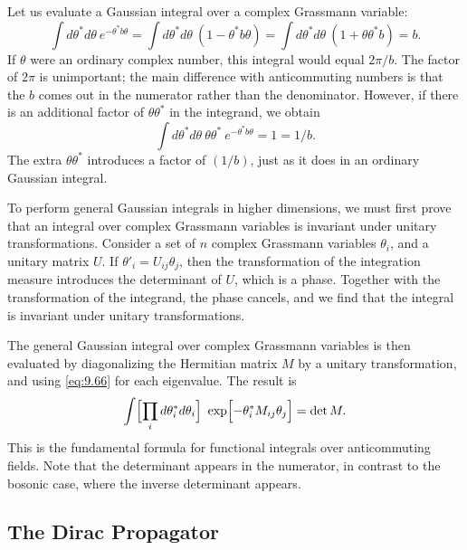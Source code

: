 Let us evaluate a Gaussian integral over a complex Grassmann variable:
\begin{equation}
  \int d\theta^{*}d\theta\ e^{-\theta^{*}b\theta}
  = \int d\theta^{*}d\theta\ (1 - \theta^{*}b\theta)
  = \int d\theta^{*}d\theta\ (1 + \theta\theta^{*}b) = b .
  \label{eq:9.66}
\end{equation}
If $\theta$ were an ordinary complex number, this integral would equal
$2\pi/b$.  The factor of $2\pi$ is unimportant; the main difference with
anticommuting numbers is that the $b$ comes out in the numerator rather than
the denominator.  However, if there is an additional factor of $\theta\theta^{*}$
in the integrand, we obtain
\begin{equation}
  \int d\theta^{*}d\theta\ \theta\theta^{*}\ e^{-\theta^{*}b\theta}
  = 1 = 1/b .
  \label{eq:9.67}
\end{equation}
The extra $\theta\theta^{*}$ introduces a factor of $(1/b)$, just as it does in
an ordinary Gaussian integral.

To perform general Gaussian integrals in higher dimensions, we must first
prove that an integral over complex Grassmann variables is invariant under
unitary transformations.  Consider a set of $n$ complex Grassmann variables
$\theta_i$, and a unitary matrix $U$.  If $\theta'_i = U_{ij}\theta_j$, then
the transformation of the integration measure introduces the determinant of
$U$, which is a phase.  Together with the transformation of the integrand, the
phase cancels, and we find that the integral is invariant under unitary
transformations.

The general Gaussian integral over complex Grassmann variables is then
evaluated by diagonalizing the Hermitian matrix $M$ by a unitary
transformation, and using \eqref{eq:9.66} for each eigenvalue.  The result is
\begin{equation}
  \int \Bigl[ \prod_i d\theta^{*}_i d\theta_i \Bigr]\
    \exp\Bigl[ -\theta^{*}_i M_{ij}\theta_j \Bigr] = \det M .
  \label{eq:9.70}
\end{equation}
This is the fundamental formula for functional integrals over anticommuting
fields.  Note that the determinant appears in the numerator, in contrast to
the bosonic case, where the inverse determinant appears.

\subsection{The Dirac Propagator}

